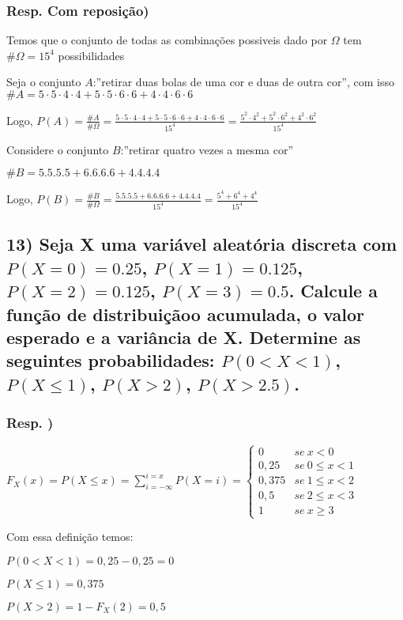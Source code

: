 \documentclass[portuguese]{article}
\begin{document}
\subsubsection*{\textmd{Resp. Com reposição)}}

Temos que o conjunto de todas as combinações possiveis dado por $\Omega$
tem $\#\Omega=15^{4}$ possibilidades

Seja o conjunto $A$:''retirar duas bolas de uma cor e duas de outra
cor'', com isso $\#A=5\cdot5\cdot4\cdot4+5\cdot5\cdot6\cdot6+4\cdot4\cdot6\cdot6$

Logo, $P(A)=\frac{\#A}{\#\Omega}=\frac{5\cdot5\cdot4\cdot4+5\cdot5\cdot6\cdot6+4\cdot4\cdot6\cdot6}{15^{4}}=\frac{5^{2}\cdot4^{2}+5^{2}\cdot6^{2}+4^{2}\cdot6^{2}}{15^{4}}$

Considere o conjunto $B$:''retirar quatro vezes a mesma cor''

$\#B=5.5.5.5+6.6.6.6+4.4.4.4$

Logo, $P(B)=\frac{\#B}{\#\Omega}=\frac{5.5.5.5+6.6.6.6+4.4.4.4}{15^{4}}=\frac{5^{4}+6^{4}+4^{4}}{15^{4}}$

\textbf{\textcompwordmark{}}


\subsection*{\textmd{13) Seja X uma variável aleatória discreta com $P(X=0)=0.25$,
$P(X=1)=0.125$, $P(X=2)=0.125$, $P(X=3)=0.5$. Calcule a função
de distribuiçãoo acumulada, o valor esperado e a variância de X. Determine
as seguintes probabilidades: $P(0<X<1)$, $P(X\le1)$, $P(X>2)$,
$P(X>2.5)$.}}


\subsubsection*{\textmd{Resp. )}}

$F_{X}(x)=P(X\leq x)=\sum_{i=-\infty}^{i=x}P(X=i)=\begin{cases}
0 & se\: x<0\\
0,25 & se\:0\leq x<1\\
0,375 & se\:1\leq x<2\\
0,5 & se\:2\leq x<3\\
1 & se\: x\geq3
\end{cases}$

Com essa definição temos:

$P(0<X<1)=0,25-0,25=0$

$P(X\le1)=0,375$

$P(X>2)=1-F_{X}(2)=0,5$
\end{document}
